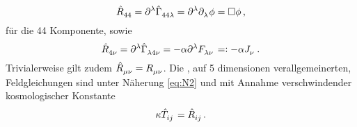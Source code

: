\begin{equation}
\tensor{\hat{R}}{_4_4}
=\tensor{\partial}{^\lambda}\tensor*{\hat{\Gamma}}{_4_4_\lambda}
=\tensor{\partial}{^\lambda}\tensor{\partial}{_\lambda}\phi=\square\phi\,, 
\end{equation}
für die 44 Komponente, sowie 
\begin{equation}
\tensor{\hat{R}}{_4_\nu}
=\tensor{\partial}{^\lambda}\tensor*{\hat{\Gamma}}{_\lambda_4_\nu}
=-\alpha\tensor{\partial}{^\lambda}\tensor{F}{_\lambda_\nu}
=:-\alpha\tensor{J}{_\nu}\,.
\end{equation}
Trivialerweise gilt zudem $\tensor{\hat{R}}{_\mu_\nu}=\tensor{R}{_\mu_\nu}$. Die
, auf 5 dimensionen verallgemeinerten, Feldgleichungen sind unter Näherung
\eqref{eq:N2} und mit Annahme verschwindender kosmologischer Konstante
\begin{equation}
\kappa\tensor{\hat{T}}{_i_j}=\tensor{\hat{R}}{_i_j}\,.
\end{equation}
